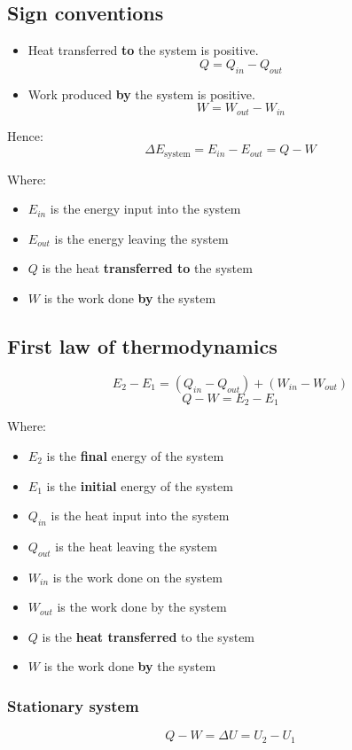 \documentclass[11pt]{article}
\begin{document}
\subsection{Sign conventions}
\label{sec:org7b78e8d}
\begin{itemize}
\item Heat transferred \textbf{to} the system is positive.
\[Q = Q_{in} - Q_{out}\]

\item Work produced \textbf{by} the system is positive.
\[W = W_{out} - W_{in}\]
\end{itemize}

Hence:
\[\Delta E_{\text{system}} = E_{in} - E_{out} = Q - W\]

Where:
\begin{itemize}
\item \(E_{in}\) is the energy input into the system
\item \(E_{out}\) is the energy leaving the system
\item \(Q\) is the heat \textbf{transferred to} the system
\item \(W\) is the work done \textbf{by} the system
\end{itemize}
\subsection{First law of thermodynamics}
\label{sec:orgd61b601}
\[E_2 - E_1 = (Q_{in} - Q_{out}) + (W_{in} - W_{out})\]
\[Q - W = E_2 - E_1\]

Where:
\begin{itemize}
\item \(E_2\) is the \textbf{final} energy of the system
\item \(E_1\) is the \textbf{initial} energy of the system
\item \(Q_{in}\) is the heat input into the system
\item \(Q_{out}\) is the heat leaving the system
\item \(W_{in}\) is the work done on the system
\item \(W_{out}\) is the work done by the system
\item \(Q\) is the \textbf{heat transferred} to the system
\item \(W\) is the work done \textbf{by} the system
\end{itemize}
\subsubsection{Stationary system}
\label{sec:org10a9e7a}
\[Q - W = \Delta U = U_2 - U_1\]
\end{document}
